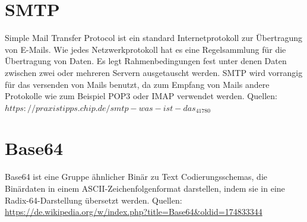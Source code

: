 \section{SMTP}
Simple Mail Transfer Protocol ist ein standard Internetprotokoll zur Übertragung von E-Mails. Wie jedes Netzwerkprotokoll hat es eine Regelsammlung für die Übertragung von Daten. Es legt Rahmenbedingungen fest unter denen Daten zwischen zwei oder mehreren Servern ausgetauscht werden. SMTP wird vorrangig für das versenden von Mails benutzt, da zum Empfang von Mails andere Protokolle wie zum Beispiel POP3 oder IMAP verwendet werden.
Quellen: \cite{_smtp:_????} $https://praxistipps.chip.de/smtp-was-ist-das_41780$
\section{Base64}
Base64 ist eine Gruppe ähnlicher Binär zu Text Codierungsschemas, die Binärdaten in einem ASCII-Zeichenfolgenformat darstellen, indem sie in eine Radix-64-Darstellung übersetzt werden.
Quellen: \cite{_base64_2018} \url{https://de.wikipedia.org/w/index.php?title=Base64&oldid=174833344}
